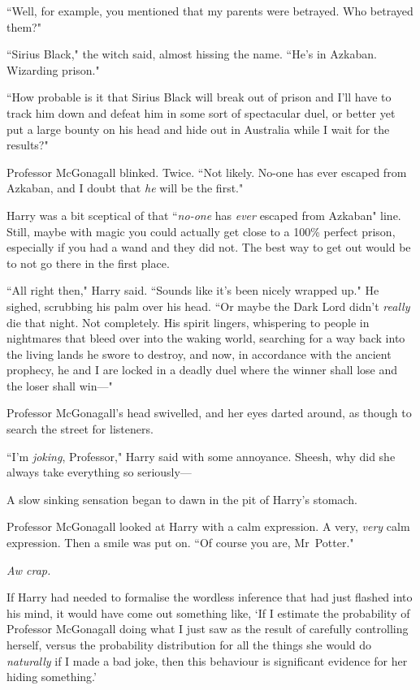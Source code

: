 ``Well, for example, you mentioned that my parents were betrayed. Who betrayed them?"

``Sirius Black," the witch said, almost hissing the name. ``He's in Azkaban. Wizarding prison."

``How probable is it that Sirius Black will break out of prison and I'll have to track him down and defeat him in some sort of spectacular duel, or better yet put a large bounty on his head and hide out in Australia while I wait for the results?"

Professor McGonagall blinked. Twice. ``Not likely. No-one has ever escaped from Azkaban, and I doubt that \emph{he} will be the first."

Harry was a bit sceptical of that ``\emph{no-one} has \emph{ever} escaped from Azkaban" line. Still, maybe with magic you could actually get close to a 100\% perfect prison, especially if you had a wand and they did not. The best way to get out would be to not go there in the first place.

``All right then," Harry said. ``Sounds like it's been nicely wrapped up." He sighed, scrubbing his palm over his head. ``Or maybe the Dark Lord didn't \emph{really} die that night. Not completely. His spirit lingers, whispering to people in nightmares that bleed over into the waking world, searching for a way back into the living lands he swore to destroy, and now, in accordance with the ancient prophecy, he and I are locked in a deadly duel where the winner shall lose and the loser shall win—"

Professor McGonagall's head swivelled, and her eyes darted around, as though to search the street for listeners.

``I'm \emph{joking}, Professor," Harry said with some annoyance. Sheesh, why did she always take everything so seriously—

A slow sinking sensation began to dawn in the pit of Harry's stomach.

Professor McGonagall looked at Harry with a calm expression. A very, \emph{very} calm expression. Then a smile was put on. ``Of course you are, Mr~Potter."

\emph{Aw crap.}

If Harry had needed to formalise the wordless inference that had just flashed into his mind, it would have come out something like, `If I estimate the probability of Professor McGonagall doing what I just saw as the result of carefully controlling herself, versus the probability distribution for all the things she would do \emph{naturally} if I made a bad joke, then this behaviour is significant evidence for her hiding something.'

